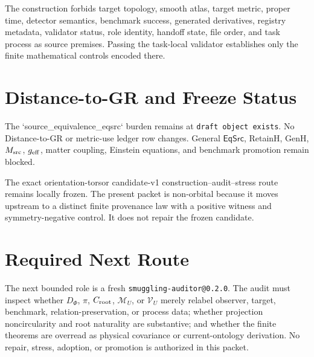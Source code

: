 \documentclass[11pt]{article}
\begin{document}
The construction forbids target topology, smooth atlas, target metric, proper
time, detector semantics, benchmark success, generated derivatives, registry
metadata, validator status, role identity, handoff state, file order, and
task process as source premises. Passing the task-local validator establishes
only the finite mathematical controls encoded there.

\section{Distance-to-GR and Freeze Status}

The `source_equivalence_eqsrc` burden remains at \texttt{draft object exists}.
No Distance-to-GR or metric-use ledger row changes. General \(\mathsf{EqSrc}\),
RetainH, GenH, \(M_{\rm src}\), \(g_{\rm eff}\), matter coupling, Einstein
equations, and benchmark promotion remain blocked.

The exact orientation-torsor candidate-v1 construction--audit--stress route
remains locally frozen. The present packet is non-orbital because it moves
upstream to a distinct finite provenance law with a positive witness and
symmetry-negative control. It does not repair the frozen candidate.

\section{Required Next Route}

The next bounded role is a fresh \texttt{smuggling-auditor@0.2.0}. The audit
must inspect whether \(D_\Phi\), \(\pi\), \(C_{\rm root}\),
\(\mathcal M_U\), or \(\mathcal V_U\) merely relabel observer, target,
benchmark, relation-preservation, or process data; whether projection
noncircularity and root naturality are substantive; and whether the finite
theorems are overread as physical covariance or current-ontology derivation.
No repair, stress, adoption, or promotion is authorized in this packet.
\end{document}
